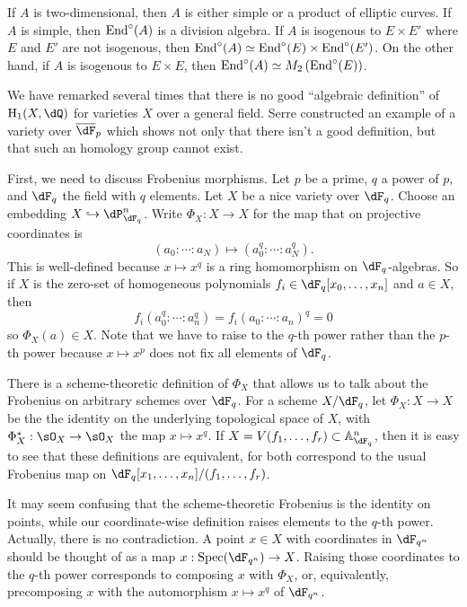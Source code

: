 \documentclass{article}
\begin{document}
\begin{example}
If $A$ is two-dimensional, then $A$ is either simple or a product of elliptic 
curves. If $A$ is simple, then $\operatorname{End}^\circ(A)$ is a division algebra. If $A$ 
is isogenous to $E\times E'$ where $E$ and $E'$ are not isogenous, then 
$\operatorname{End}^\circ(A)\simeq \operatorname{End}^\circ(E)\times \operatorname{End}^\circ(E')$. On the other hand, if 
$A$ is isogenous to $E\times E$, then 
$\operatorname{End}^\circ(A)\simeq M_2\left(\operatorname{End}^\circ(E)\right)$. 
\end{example}

We have remarked several times that there is no good ``algebraic definition'' 
of $\h_1(X,\dQ)$ for varieties $X$ over a general field. Serre constructed an 
example of a variety over $\overline\dF_p$ which shows not only that there 
isn't a good definition, but that such an homology group cannot exist. 

First, we need to discuss Frobenius morphisms. Let $p$ be a prime, $q$ a power 
of $p$, and $\dF_q$ the field with $q$ elements. Let $X$ be a nice variety over 
$\dF_q$. Choose an embedding $X\hookrightarrow \dP_{\dF_q}^n$. Write 
$\Phi_X:X\to X$ for the map that on projective coordinates is 
\[
  (a_0:\cdots:a_N) \mapsto (a_0^q:\cdots :a_N^q) \text{.}
\]
This is well-defined because $x\mapsto x^q$ is a ring homomorphism on 
$\dF_q$-algebras. So if $X$ is the zero-set of homogeneous polynomials 
$f_i\in \dF_q[x_0,\dots,x_n]$ and $a\in X$, then 
\[
  f_i(a_0^q:\cdots:a_n^q) = f_i(a_0:\cdots:a_n)^q = 0
\]
so $\Phi_X(a)\in X$. Note that we have to raise to the $q$-th power rather 
than the $p$-th power because $x\mapsto x^p$ does not fix all elements of 
$\dF_q$. 

There is a scheme-theoretic definition of $\Phi_X$ that allows us to talk about 
the Frobenius on arbitrary schemes over $\dF_q$. For a scheme $X/\dF_q$, let 
$\Phi_X:X\to X$ be the the identity on the underlying topological space of $X$, 
with $\Phi_X^\ast:\sO_X\to \sO_X$ the map $x\mapsto x^q$. If 
$X=V(f_1,\dots,f_r)\subset \mathbb{A}_{\dF_q}^n$, then it is easy to see that 
these definitions are equivalent, for both correspond to the usual Frobenius 
map on $\dF_q[x_1,\dots,x_n]/(f_1,\dots,f_r)$. 

It may seem confusing that the scheme-theoretic Frobenius is the identity on 
points, while our coordinate-wise definition raises elements to the $q$-th 
power. Actually, there is no contradiction. A point $x\in X$ with coordinates in 
$\dF_{q^n}$ should be thought of as a map $x:\spec(\dF_{q^n})\to X$. Raising 
those coordinates to the $q$-th power corresponds to composing $x$ with 
$\Phi_X$, or, equivalently, precomposing $x$ with the automorphism 
$x\mapsto x^q$ of $\dF_{q^n}$. 
\end{document}

